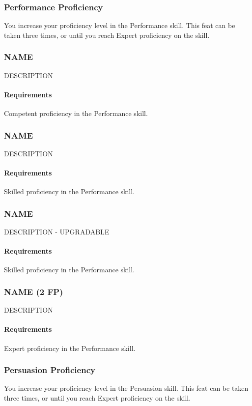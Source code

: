 \subsubsection{Performance Proficiency} \label{feat::performanceprof}
    You increase your proficiency level in the Performance skill.
    This feat can be taken three times, or until you reach Expert proficiency on the skill.
\subsubsection{NAME} \label{feat::name}
    DESCRIPTION
    \paragraph{Requirements} Competent proficiency in the Performance skill.
\subsubsection{NAME} \label{feat::name}
    DESCRIPTION
    \paragraph{Requirements} Skilled proficiency in the Performance skill.
\subsubsection{NAME} \label{feat::name}
    DESCRIPTION - UPGRADABLE
    \paragraph{Requirements} Skilled proficiency in the Performance skill.
\subsubsection{NAME (2 FP)} \label{feat::name}
    DESCRIPTION
    \paragraph{Requirements} Expert proficiency in the Performance skill.
\subsubsection{Persuasion Proficiency} \label{feat::persuasionprof}
    You increase your proficiency level in the Persuasion skill.
    This feat can be taken three times, or until you reach Expert proficiency on the skill.
